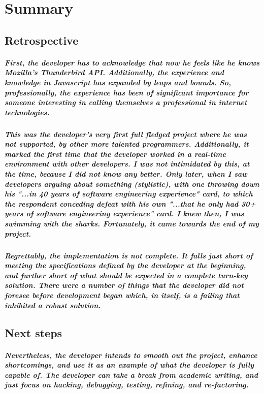\chapter{Summary}

\section{Retrospective}

\paragraph{First, the developer has to acknowledge that \emph{now} he feels like he knows Mozilla's Thunderbird API. Additionally, the experience and knowledge in Javascript has expanded by leaps and bounds. So, professionally, the experience has been of significant importance for someone interesting in calling themselves a professional in internet technologies.}

\paragraph{This was the developer's very first full fledged project where he was not supported, by other more talented programmers. Additionally, it marked the first time that the developer worked in a real-time environment with other developers. I was not intimidated by this, at the time, because I did not know any better. Only later, when I saw developers arguing about something (stylistic), with one throwing down his "...in 40 years of software engineering experience" card, to which the respondent conceding defeat with his own "...that he only had 30+ years of software engineering experience" card. I knew then, I was swimming with the sharks. Fortunately, it came towards the end of my project.}

\paragraph{Regrettably, the implementation is not complete. It falls just short of meeting the specifications defined by the developer at the beginning, and further short of what should be expected in a complete turn-key solution. There were a number of things that the developer did not foresee before development began which, in itself, is a failing that inhibited a robust solution.}

\section{Next steps}

\paragraph{Nevertheless, the developer intends to smooth out the project, enhance shortcomings, and use it as an example of what the developer is fully capable of. The developer can take a break from academic writing, and just focus on hacking, debugging, testing, refining, and re-factoring.}